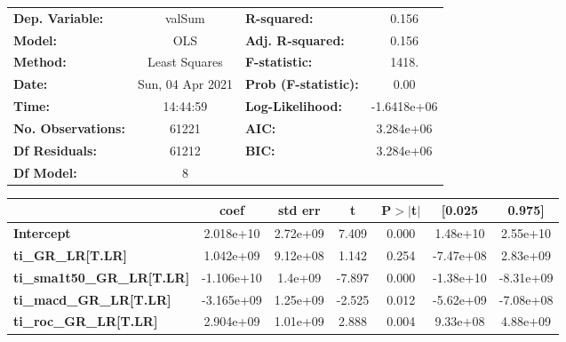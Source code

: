 \begin{center}
\begin{tabular}{lclc}
\toprule
\textbf{Dep. Variable:}                 &      valSum      & \textbf{  R-squared:         } &      0.156   \\
\textbf{Model:}                         &       OLS        & \textbf{  Adj. R-squared:    } &      0.156   \\
\textbf{Method:}                        &  Least Squares   & \textbf{  F-statistic:       } &      1418.   \\
\textbf{Date:}                          & Sun, 04 Apr 2021 & \textbf{  Prob (F-statistic):} &      0.00    \\
\textbf{Time:}                          &     14:44:59     & \textbf{  Log-Likelihood:    } & -1.6418e+06  \\
\textbf{No. Observations:}              &       61221      & \textbf{  AIC:               } &  3.284e+06   \\
\textbf{Df Residuals:}                  &       61212      & \textbf{  BIC:               } &  3.284e+06   \\
\textbf{Df Model:}                      &           8      & \textbf{                     } &              \\
\bottomrule
\end{tabular}
\begin{tabular}{lcccccc}
                                        & \textbf{coef} & \textbf{std err} & \textbf{t} & \textbf{P$> |$t$|$} & \textbf{[0.025} & \textbf{0.975]}  \\
\midrule
\textbf{Intercept}                      &    2.018e+10  &     2.72e+09     &     7.409  &         0.000        &     1.48e+10    &     2.55e+10     \\
\textbf{ti\_GR\_LR[T.LR]}               &    1.042e+09  &     9.12e+08     &     1.142  &         0.254        &    -7.47e+08    &     2.83e+09     \\
\textbf{ti\_sma1t50\_GR\_LR[T.LR]}      &   -1.106e+10  &      1.4e+09     &    -7.897  &         0.000        &    -1.38e+10    &    -8.31e+09     \\
\textbf{ti\_macd\_GR\_LR[T.LR]}         &   -3.165e+09  &     1.25e+09     &    -2.525  &         0.012        &    -5.62e+09    &    -7.08e+08     \\
\textbf{ti\_roc\_GR\_LR[T.LR]}          &    2.904e+09  &     1.01e+09     &     2.888  &         0.004        &     9.33e+08    &     4.88e+09     \\

\end{tabular}
\end{center}
